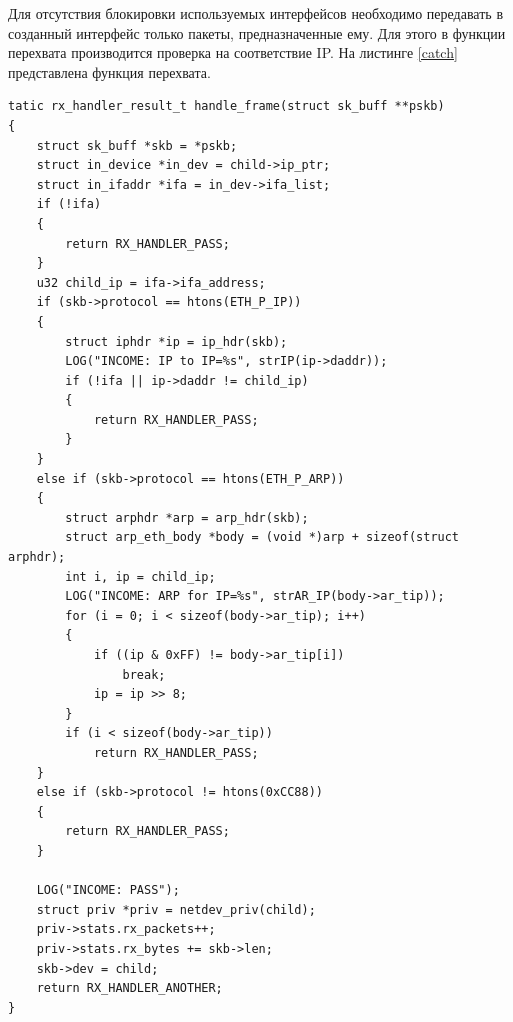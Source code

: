 \documentclass[14pt, a4paper]{extarticle}
\begin{document}
Для отсутствия блокировки используемых интерфейсов необходимо передавать в созданный интерфейс только пакеты, предназначенные ему. Для этого в функции перехвата производится проверка на соответствие IP. На листинге \ref{catch} представлена функция перехвата.
\begin{lstlisting}[caption=Функция перехвата, label=catch]
tatic rx_handler_result_t handle_frame(struct sk_buff **pskb)
{
    struct sk_buff *skb = *pskb;
    struct in_device *in_dev = child->ip_ptr;
    struct in_ifaddr *ifa = in_dev->ifa_list;
    if (!ifa)
    {
        return RX_HANDLER_PASS;
    }
    u32 child_ip = ifa->ifa_address;
    if (skb->protocol == htons(ETH_P_IP))
    {
        struct iphdr *ip = ip_hdr(skb);
        LOG("INCOME: IP to IP=%s", strIP(ip->daddr));
        if (!ifa || ip->daddr != child_ip)
        {
            return RX_HANDLER_PASS;
        }
    }
    else if (skb->protocol == htons(ETH_P_ARP))
    {
        struct arphdr *arp = arp_hdr(skb);
        struct arp_eth_body *body = (void *)arp + sizeof(struct arphdr);
        int i, ip = child_ip;
        LOG("INCOME: ARP for IP=%s", strAR_IP(body->ar_tip));
        for (i = 0; i < sizeof(body->ar_tip); i++)
        {
            if ((ip & 0xFF) != body->ar_tip[i])
                break;
            ip = ip >> 8;
        }
        if (i < sizeof(body->ar_tip))
            return RX_HANDLER_PASS;
    }
    else if (skb->protocol != htons(0xCC88))
    {
        return RX_HANDLER_PASS;
    }
    
    LOG("INCOME: PASS");
    struct priv *priv = netdev_priv(child);
    priv->stats.rx_packets++;
    priv->stats.rx_bytes += skb->len;
    skb->dev = child;
    return RX_HANDLER_ANOTHER;
}
\end{lstlisting}
\end{document}
